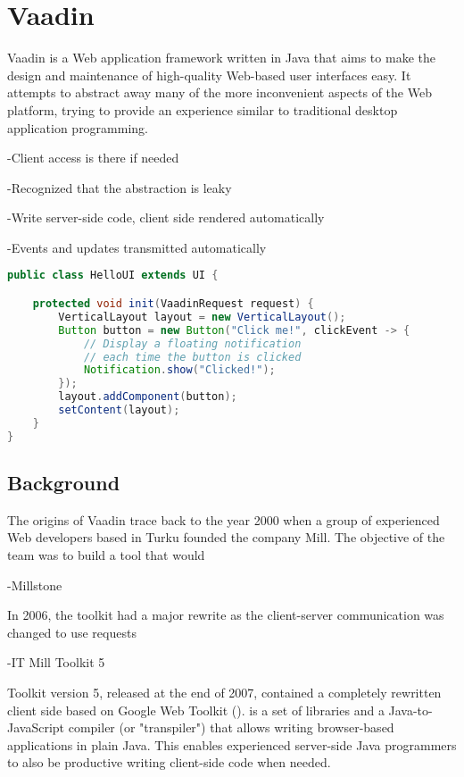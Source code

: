 \chapter{Vaadin}

Vaadin is a Web application framework written in Java that aims to make the design and maintenance of high-quality Web-based user interfaces easy. It attempts to abstract away many of the more inconvenient aspects of the Web platform, trying to provide an experience similar to traditional desktop application programming.

-Client access is there if needed

-Recognized that the abstraction is leaky

-Write server-side  code, client side rendered automatically

-Events and updates transmitted automatically

\begin{code}
\begin{lstlisting}[language=Java,caption=A simple Vaadin application.\label{listing:vaadin-ui}]
public class HelloUI extends UI {

    protected void init(VaadinRequest request) {
        VerticalLayout layout = new VerticalLayout();
        Button button = new Button("Click me!", clickEvent -> {
            // Display a floating notification
            // each time the button is clicked
            Notification.show("Clicked!");
        });    
        layout.addComponent(button);
        setContent(layout);
    }
}
\end{lstlisting}
\end{code}

\section{Background}

The origins of Vaadin trace back to the year 2000 when a group of experienced Web developers based in Turku founded the company  Mill. The objective of the team was to build a tool that would 

-Millstone

In 2006, the toolkit had a major rewrite as the client-server communication was changed to use  requests

-IT Mill Toolkit 5

Toolkit version 5, released at the end of 2007, contained a completely rewritten client side based on Google Web Toolkit ().  is a set of libraries and a Java-to-JavaScript compiler (or "transpiler") that allows writing browser-based applications in plain Java. This enables experienced server-side Java programmers to also be productive writing client-side code when needed.


